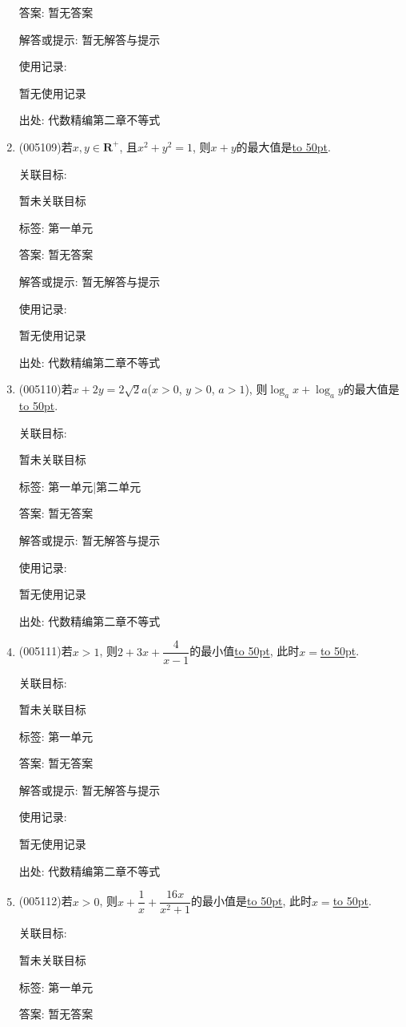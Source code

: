 \documentclass[10pt,a4paper]{article}
\newcommand{\blank}[1]{\underline{\hbox to #1pt{}}}
\begin{document}
\begin{enumerate}[1.]
答案: 暂无答案

解答或提示: 暂无解答与提示

使用记录:

暂无使用记录


出处: 代数精编第二章不等式
\item { (005109)}若$x,y\in \mathbf{R}^+$, 且$x^2+y^2=1$, 则$x+y$的最大值是\blank{50}.


关联目标:

暂未关联目标



标签: 第一单元

答案: 暂无答案

解答或提示: 暂无解答与提示

使用记录:

暂无使用记录


出处: 代数精编第二章不等式
\item { (005110)}若$x+2y=2\sqrt 2a$($x>0$, $y>0$, $a>1$), 则$\log_ax+\log_ay$的最大值是\blank{50}.


关联目标:

暂未关联目标



标签: 第一单元|第二单元

答案: 暂无答案

解答或提示: 暂无解答与提示

使用记录:

暂无使用记录


出处: 代数精编第二章不等式
\item { (005111)}若$x>1$, 则$2+3x+\dfrac 4{x-1}$的最小值\blank{50}, 此时$x=$\blank{50}.


关联目标:

暂未关联目标



标签: 第一单元

答案: 暂无答案

解答或提示: 暂无解答与提示

使用记录:

暂无使用记录


出处: 代数精编第二章不等式
\item { (005112)}若$x>0$, 则$x+\dfrac 1x+\dfrac{16x}{x^2+1}$的最小值是\blank{50}, 此时$x=$\blank{50}.


关联目标:

暂未关联目标



标签: 第一单元

答案: 暂无答案


\end{enumerate}
\end{document}
